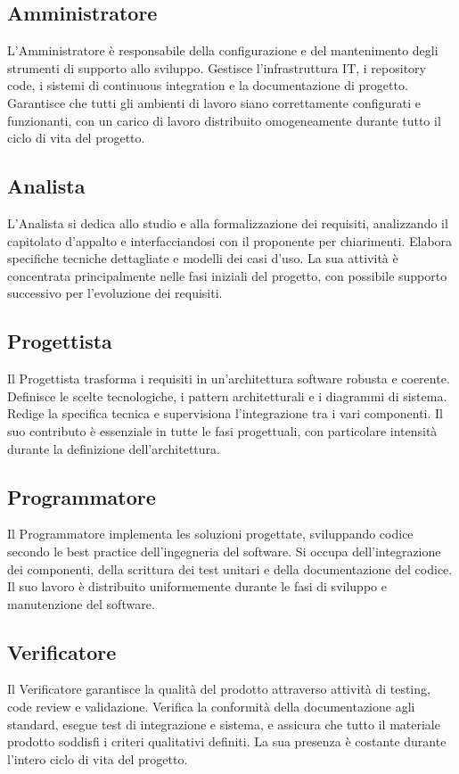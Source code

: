 \documentclass[a4paper,11pt]{article}
\begin{document}
\subsection{Amministratore}
L'Amministratore è responsabile della configurazione e del mantenimento degli strumenti di supporto allo sviluppo. Gestisce l'infrastruttura IT, i repository code, i sistemi di continuous integration e la documentazione di progetto. Garantisce che tutti gli ambienti di lavoro siano correttamente configurati e funzionanti, con un carico di lavoro distribuito omogeneamente durante tutto il ciclo di vita del progetto.

\subsection{Analista}
L'Analista si dedica allo studio e alla formalizzazione dei requisiti, analizzando il capitolato d'appalto e interfacciandosi con il proponente per chiarimenti. Elabora specifiche tecniche dettagliate e modelli dei casi d'uso. La sua attività è concentrata principalmente nelle fasi iniziali del progetto, con possibile supporto successivo per l'evoluzione dei requisiti.

\subsection{Progettista}
Il Progettista trasforma i requisiti in un'architettura software robusta e coerente. Definisce le scelte tecnologiche, i pattern architetturali e i diagrammi di sistema. Redige la specifica tecnica e supervisiona l'integrazione tra i vari componenti. Il suo contributo è essenziale in tutte le fasi progettuali, con particolare intensità durante la definizione dell'architettura.

\subsection{Programmatore}
Il Programmatore implementa les soluzioni progettate, sviluppando codice secondo le best practice dell'ingegneria del software. Si occupa dell'integrazione dei componenti, della scrittura dei test unitari e della documentazione del codice. Il suo lavoro è distribuito uniformemente durante le fasi di sviluppo e manutenzione del software.

\subsection{Verificatore}
Il Verificatore garantisce la qualità del prodotto attraverso attività di testing, code review e validazione. Verifica la conformità della documentazione agli standard, esegue test di integrazione e sistema, e assicura che tutto il materiale prodotto soddisfi i criteri qualitativi definiti. La sua presenza è costante durante l'intero ciclo di vita del progetto.
\end{document}
